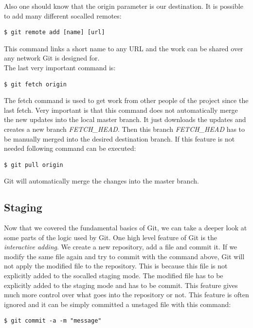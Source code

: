 Also one should know that the origin parameter is our destination. It is possible to
add many different socalled remotes:

\begin{lstlisting}
$ git remote add [name] [url]
\end{lstlisting}

This command links a short name to any URL and the work can be shared over any network Git is designed for. \cite[chapter 2.9]{gitpro2009}  \\

The last very important command is:
\begin{lstlisting}
$ git fetch origin
\end{lstlisting}

The fetch command is used to get work from other people of the project since
the last fetch. Very important is that this command does not
automatically merge the new updates into the local master branch. It just
downloads the updates and creates a new branch \emph{FETCH\_HEAD}. Then this branch \emph{FETCH\_HEAD} has to
be manually merged into the desired destination branch. 
If this feature is not needed following command can be executed:
\begin{lstlisting}
$ git pull origin
\end{lstlisting}
Git will automatically merge the changes into the master branch.
\cite[chapter 2.9]{gitpro2009} \\

\subsection {Staging}

Now that we covered the fundamental basics of Git, we can take a deeper look at
some parts of the logic used by Git. One high level feature of Git is the
\emph{interactive adding}. We create a new repository, add a file and commit
it. If we modify the same file again and try to commit with the command above,
Git will not apply the modified file to the repository. This is because this file is
not explicitly added to the socalled staging mode. The modified file has to be explicitly added to the staging mode and has to be commit. This feature gives much
more control over what goes into the repository or not. This feature is often
ignored and it can be simply committed a unstaged file with this command:

\begin{lstlisting}
$ git commit -a -m "message"
\end{lstlisting}


